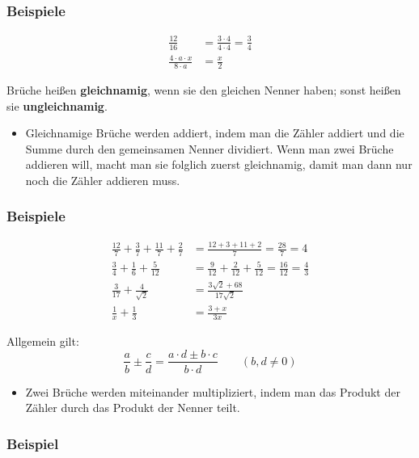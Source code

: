 \subsubsection{Beispiele}

\begin{align*}
  \frac{12}{16} &= \frac{3 \cdot 4}{4 \cdot 4} = \frac{3}{4}\\
  \frac{4 \cdot a \cdot x}{8 \cdot a} &= \frac{x}{2}
\end{align*}\beispielende

Brüche heißen \textbf{gleichnamig}, wenn sie den gleichen Nenner haben; sonst heißen sie \textbf{ungleichnamig}.

\begin{itemize}
  \item Gleichnamige Brüche werden addiert, indem man die Zähler addiert und die Summe durch den gemeinsamen Nenner dividiert. Wenn man zwei Brüche addieren will, macht man sie folglich zuerst gleichnamig, damit man dann nur noch die Zähler addieren muss.
\end{itemize}

\subsubsection{Beispiele}

\begin{align*}
  \frac{12}{7} + \frac{3}{7} + \frac{11}{7} + \frac{2}{7} &= \frac{12+3+11+2}{7} = \frac{28}{7} = 4\\
  \frac{3}{4} + \frac{1}{6} + \frac{5}{12} &= \frac{9}{12} + \frac{2}{12} + \frac{5}{12} = \frac{16}{12} = \frac{4}{3}\\
  \frac{3}{17} + \frac{4}{\sqrt{2}} &= \frac{3\sqrt{2} + 68}{17\sqrt{2}}\\
  \frac{1}{x} + \frac{1}{3} &= \frac{3+x}{3x}
\end{align*}\beispielende

Allgemein gilt:
\[ \frac{a}{b} \pm \frac{c}{d} = \frac{a \cdot d \pm b \cdot c}{b \cdot d} \qquad (b, d \neq 0) \]

\begin{itemize}
  \item Zwei Brüche werden miteinander multipliziert, indem man das Produkt der Zähler durch das Produkt der Nenner teilt.
\end{itemize}

\subsubsection{Beispiel}

